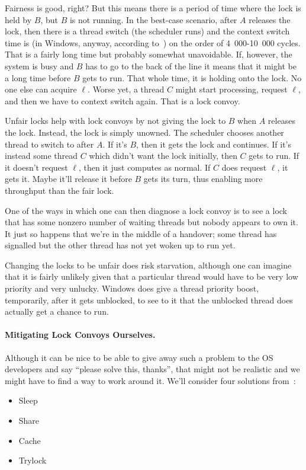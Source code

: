 Fairness is good, right? But this means there is a period of time where the lock is held by $B$, but $B$ is not running. In the best-case scenario, after $A$ releases the lock, then there is a thread switch (the scheduler runs) and the context switch time is (in Windows, anyway, according to~\cite{anticonvoy}) on the order of 4~000-10~000 cycles. That is a fairly long time but probably somewhat unavoidable. If, however, the system is busy and $B$ has to go to the back of the line it means that it might be a long time before $B$ gets to run. That whole time, it is holding onto the lock. No one else can acquire $\ell$. Worse yet, a thread $C$ might start processing, request $\ell$, and then we have to context switch again. That is a lock convoy.

Unfair locks help with lock convoys by not giving the lock to $B$ when $A$ releases the lock. Instead, the lock is simply unowned. The scheduler chooses another thread to switch to after $A$. If it's $B$, then it gets the lock and continues. If it's instead some thread $C$ which didn't want the lock initially, then $C$ gets to run. If it doesn't request $\ell$, then it just computes as normal. If $C$ does request $\ell$, it gets it. Maybe it'll release it before $B$ gets its turn, thus enabling more throughput than the fair lock.

One of the ways in which one can then diagnose a lock convoy is to see a lock that has some nonzero number of waiting threads but nobody appears to own it. It just so happens that we're in the middle of a handover; some thread has signalled but the other thread has not yet woken up to run yet.

Changing the locks to be unfair does risk starvation, although one can imagine that it is fairly unlikely given that a particular thread would have to be very low priority and very unlucky. Windows does give a thread priority boost, temporarily, after it gets unblocked, to see to it that the unblocked thread does actually get a chance to run.

\paragraph{Mitigating Lock Convoys Ourselves.} Although it can be nice to be able to give away such a problem to the OS developers and say ``please solve this, thanks'', that might not be realistic and we might have to find a way to work around it. We'll consider four solutions from~\cite{lockconvoys}:

\begin{itemize}
	\item Sleep
	\item Share
	\item Cache
	\item Trylock
\end{itemize}

